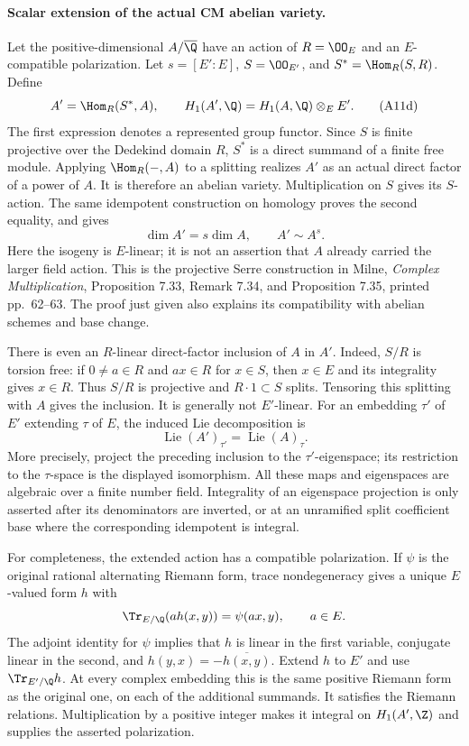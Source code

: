 \paragraph{Scalar extension of the actual CM abelian variety.}
Let the positive-dimensional $A/\overline\Q$ have an action of $R=\OO_E$ and an
$E$-compatible polarization.  Let
$s=[E':E]$, $S=\OO_{E'}$, and $S^*=\Hom_R(S,R)$.  Define
\[
       A'=\Hom_R(S^*,A),
       \qquad H_1(A',\Q)=H_1(A,\Q)\otimes_E E'.
 \tag{A11d}
\]
The first expression denotes a represented group functor.
Since $S$ is finite projective over the Dedekind domain $R$,
$S^*$ is a direct summand of a finite free module.  Applying
$\Hom_R(-,A)$ to a splitting realizes $A'$ as an actual direct
factor of a power of $A$.  It is therefore an abelian variety.
Multiplication on $S$ gives its $S$-action.  The same idempotent
construction on homology proves the second equality, and gives
\[
       \dim A'=s\dim A,\qquad A'\sim A^s.
 \tag{A11e}
\]
Here the isogeny is $E$-linear; it is not an assertion that $A$
already carried the larger field action.  This is the projective
Serre construction in Milne, \emph{Complex Multiplication},
Proposition 7.33, Remark 7.34, and Proposition 7.35, printed
pp.~62--63.  The proof just given also explains its compatibility
with abelian schemes and base change.

There is even an $R$-linear direct-factor inclusion of $A$ in
$A'$.  Indeed, $S/R$ is torsion free: if $0\ne a\in R$ and
$ax\in R$ for $x\in S$, then $x\in E$ and its integrality gives
$x\in R$.  Thus $S/R$ is projective and $R\cdot1\subset S$
splits.  Tensoring this splitting with $A$ gives the inclusion.
It is generally not $E'$-linear.  For an embedding $\tau'$ of
$E'$ extending $\tau$ of $E$, the induced Lie decomposition is
\[
       \operatorname{Lie}(A')_{\tau'}
                       =\operatorname{Lie}(A)_\tau.
 \tag{A11f}
\]
More precisely, project the preceding inclusion to the
$\tau'$-eigenspace; its restriction to the $\tau$-space is the
displayed isomorphism.  All these maps and eigenspaces are
algebraic over a finite number field.  Integrality of an
eigenspace projection is only asserted after its denominators
are inverted, or at an unramified split coefficient base where
the corresponding idempotent is integral.

For completeness, the extended action has a compatible
polarization.  If $\psi$ is the original rational alternating
Riemann form, trace nondegeneracy gives a unique $E$-valued form
$h$ with
\[
       \Tr_{E/\Q}(a h(x,y))=\psi(ax,y),\qquad a\in E.
\]
The adjoint identity for $\psi$ implies that $h$ is linear in
the first variable, conjugate linear in the second, and
$h(y,x)=-\overline{h(x,y)}$.  Extend $h$ to $E'$ and use
$\Tr_{E'/\Q}h$.  At every complex embedding this is the same
positive Riemann form as the original one, on each of the
additional summands.  It satisfies the Riemann relations.
Multiplication by a positive integer makes it integral on
$H_1(A',\Z)$ and supplies the asserted polarization.

